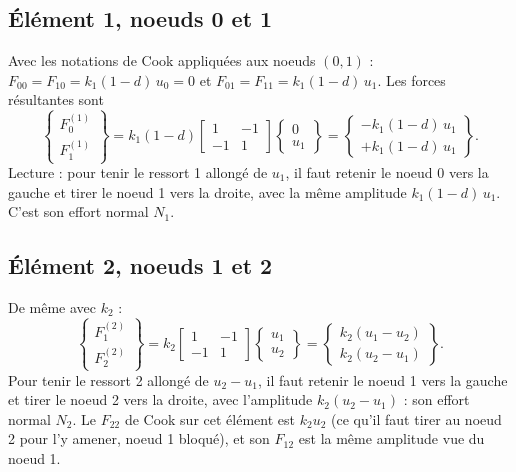 \documentclass[11pt,a4paper]{article}
\newcommand{\kun}{k_1(1-d)}
\begin{document}
\subsection{Élément 1, noeuds 0 et 1}
Avec les notations de Cook appliquées aux noeuds $(0,1)$ : $F_{00} = F_{10} = \kun\,u_0 = 0$ et
$F_{01} = F_{11} = \kun\,u_1$. Les forces résultantes sont
\begin{equation}
  \begin{Bmatrix}F_0^{(1)}\\F_1^{(1)}\end{Bmatrix}
  = \kun\begin{bmatrix}1 & -1\\ -1 & 1\end{bmatrix}\begin{Bmatrix}0\\u_1\end{Bmatrix}
  = \begin{Bmatrix}-\kun\,u_1\\ +\kun\,u_1\end{Bmatrix}.
\end{equation}
Lecture : pour tenir le ressort 1 allongé de $u_1$, il faut retenir le noeud 0 vers la gauche
et tirer le noeud 1 vers la droite, avec la même amplitude $\kun\,u_1$. C'est son effort
normal $N_1$.

\subsection{Élément 2, noeuds 1 et 2}
De même avec $k_2$ :
\begin{equation}
  \begin{Bmatrix}F_1^{(2)}\\F_2^{(2)}\end{Bmatrix}
  = k_2\begin{bmatrix}1 & -1\\ -1 & 1\end{bmatrix}\begin{Bmatrix}u_1\\u_2\end{Bmatrix}
  = \begin{Bmatrix}k_2(u_1-u_2)\\ k_2(u_2-u_1)\end{Bmatrix}.
\end{equation}
Pour tenir le ressort 2 allongé de $u_2 - u_1$, il faut retenir le noeud 1 vers la gauche
et tirer le noeud 2 vers la droite, avec l'amplitude $k_2(u_2-u_1)$ : son effort normal $N_2$.
Le $F_{22}$ de Cook sur cet élément est $k_2u_2$ (ce qu'il faut tirer au noeud 2 pour l'y
amener, noeud 1 bloqué), et son $F_{12}$ est la même amplitude vue du noeud 1.
\end{document}
